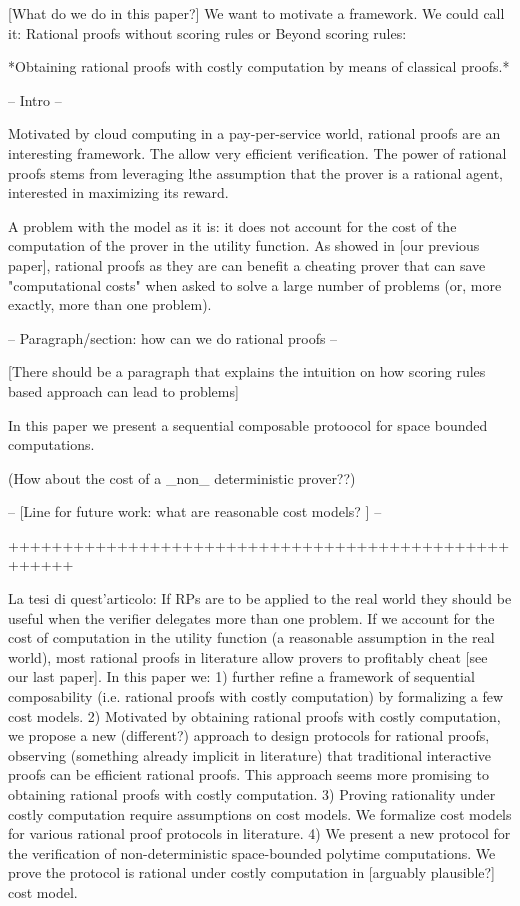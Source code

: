 [What do we do in this paper?]
We want to motivate a framework. We could call it: Rational proofs without scoring rules or Beyond scoring rules:

*Obtaining rational proofs with costly computation by means of classical proofs.*

-- Intro --

Motivated by cloud computing in a pay-per-service world, rational proofs are an interesting framework.
The allow very efficient verification. The power of rational proofs stems from leveraging lthe assumption that the prover is a rational agent, interested in maximizing its reward.

A problem with the model as it is: it does not account for the cost of the computation of the prover in the utility function. As showed in [our previous paper], rational proofs as they
are can benefit a cheating prover that can save "computational costs" when asked to solve a large number of problems (or, more exactly, more than one problem).

  

-- Paragraph/section: how can we do rational proofs --

[There should be a paragraph that explains the intuition on how scoring rules based approach can lead to problems]


In this paper we present a sequential composable protoocol for space bounded computations.

(How about the cost of a _non_ deterministic prover??)



-- [Line for future work: what are reasonable cost models? ] --



++++++++++++++++++++++++++++++++++++++++++++++++++++

La tesi di quest'articolo:
If RPs are to be applied to the real world they should be useful when the verifier delegates more than one problem.
If we account for the cost of computation in the utility function (a reasonable assumption in the real world), most rational proofs in literature allow provers to profitably cheat [see our last paper].
In this paper we:
1) further refine a framework of sequential composability (i.e. rational proofs with costly computation) by formalizing a few cost models.
2) Motivated by obtaining rational proofs with costly computation, we propose a new (different?) approach to design protocols for rational proofs, observing (something already implicit in literature) that traditional interactive proofs can be efficient rational proofs. This approach seems more promising to obtaining rational proofs with costly computation.
3) Proving rationality under costly computation require assumptions on cost models. We formalize cost models for various rational proof protocols in literature. 
4) We present a new protocol for the verification of non-deterministic space-bounded polytime computations. We prove the protocol is rational under costly computation in [arguably plausible?] cost model.